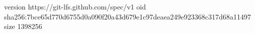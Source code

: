 version https://git-lfs.github.com/spec/v1
oid sha256:7bce65d770d6755d0a090f20a43d679e1c97deaea249e923368c317d68a11497
size 1398256
